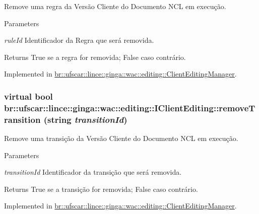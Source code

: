 Remove uma regra da Versão Cliente do Documento NCL em execução. 


\begin{DoxyParams}{Parameters}
\item[{\em ruleId}]Identificador da Regra que será removida. \end{DoxyParams}
\begin{DoxyReturn}{Returns}
True se a regra for removida; False caso contrário. 
\end{DoxyReturn}


Implemented in \hyperlink{classbr_1_1ufscar_1_1lince_1_1ginga_1_1wac_1_1editing_1_1ClientEditingManager_a5b363245776a5a71bd3c7628dcf91f7e}{br::ufscar::lince::ginga::wac::editing::ClientEditingManager}.

\hypertarget{classbr_1_1ufscar_1_1lince_1_1ginga_1_1wac_1_1editing_1_1IClientEditing_a4f88db31bb7d754489e7cc965d9035c2}{
\subsubsection[{removeTransition}]{\setlength{\rightskip}{0pt plus 5cm}virtual bool br::ufscar::lince::ginga::wac::editing::IClientEditing::removeTransition (string {\em transitionId})}}
\label{classbr_1_1ufscar_1_1lince_1_1ginga_1_1wac_1_1editing_1_1IClientEditing_a4f88db31bb7d754489e7cc965d9035c2}


Remove uma transição da Versão Cliente do Documento NCL em execução. 


\begin{DoxyParams}{Parameters}
\item[{\em transitionId}]Identificador da transição que será removida. \end{DoxyParams}
\begin{DoxyReturn}{Returns}
True se a transição for removida; False caso contrário. 
\end{DoxyReturn}


Implemented in \hyperlink{classbr_1_1ufscar_1_1lince_1_1ginga_1_1wac_1_1editing_1_1ClientEditingManager_a6aebcca439720cc2c9b69d6b7b5c45c7}{br::ufscar::lince::ginga::wac::editing::ClientEditingManager}.

